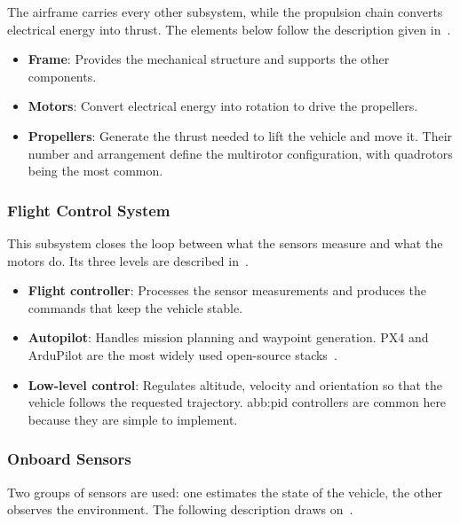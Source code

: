 The airframe carries every other subsystem, while the propulsion chain converts
electrical energy into thrust. The elements below follow the description given
in~\cite{mohsan2023unmanned}.

\begin{itemize}[itemsep=0.4em]
    \item \textbf{Frame}: Provides the mechanical structure and supports the
          other components.
    \item \textbf{Motors}: Convert electrical energy into rotation to drive the
          propellers.
    \item \textbf{Propellers}: Generate the thrust needed to lift the vehicle
          and move it. Their number and arrangement define the multirotor
          configuration, with quadrotors being the most common.
\end{itemize}

\subsubsection*{Flight Control System}

This subsystem closes the loop between what the sensors measure and what the
motors do. Its three levels are described in~\cite{mohsan2023unmanned}.

\begin{itemize}[itemsep=0.4em]
    \item \textbf{Flight controller}: Processes the sensor measurements and
          produces the commands that keep the vehicle stable.
    \item \textbf{Autopilot}: Handles mission planning and waypoint generation.
          PX4 and ArduPilot are the most widely used open-source
          stacks~\cite{acharya2020cornet}.
    \item \textbf{Low-level control}: Regulates altitude, velocity and
          orientation so that the vehicle follows the requested trajectory.
          \Gls{abb:pid} controllers are common here because they are simple to
          implement.
\end{itemize}

\subsubsection*{Onboard Sensors}

Two groups of sensors are used: one estimates the state of the vehicle, the
other observes the environment. The following description draws
on~\cite{jacinto2024pegasus, pore2026drone}.

